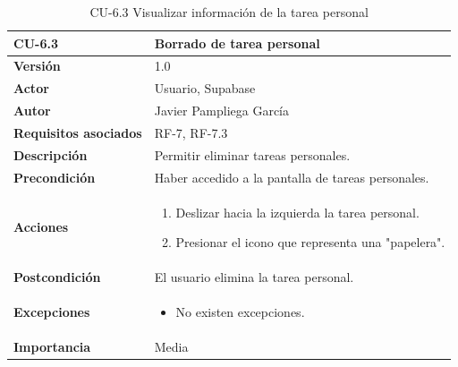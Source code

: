 \begin{table}[p]
	\centering
	\begin{tabularx}{\linewidth}{ p{} p{} }
		\toprule
		\textbf{CU-6.3}    & \textbf{Borrado de tarea personal}\\
		\toprule
		\textbf{Versión}              & 1.0    \\
            \textbf{Actor}                & Usuario, Supabase \\
		\textbf{Autor}                & Javier Pampliega García \\
		\textbf{Requisitos asociados} & RF-7, RF-7.3\\
		\textbf{Descripción}          & Permitir eliminar tareas personales. \\
		\textbf{Precondición}         & Haber accedido a la pantalla de tareas personales. \\
		\textbf{Acciones}             &
		\begin{enumerate}
			\def\labelenumi{\arabic{enumi}.}
			\tightlist
			\item Deslizar hacia la izquierda la tarea personal.
                \item Presionar el icono que representa una "papelera".
		\end{enumerate}\\
		\textbf{Postcondición}        & El usuario elimina la tarea personal. \\
		\textbf{Excepciones}          & \begin{itemize}
		    \item No existen excepciones.
		\end{itemize} \\
		\textbf{Importancia}          & Media \\
		\bottomrule
	\end{tabularx}
	\caption{CU-6.3 Visualizar información de la tarea personal}
\end{table}

